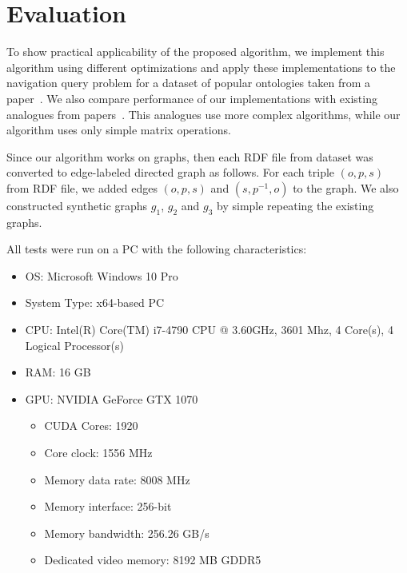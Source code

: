 \section{Evaluation}
To show practical applicability of the proposed algorithm, we implement this algorithm using different optimizations and apply these implementations to the navigation query problem for a dataset of popular ontologies taken from a paper~\cite{RDF}. We also compare performance of our implementations with existing analogues from papers~\cite{GLL,RDF}. This analogues use more complex algorithms, while our algorithm uses only simple matrix operations.

Since our algorithm works on graphs, then each RDF file from dataset was converted to edge-labeled directed graph as follows. For each triple $(o,p,s)$ from RDF file, we added edges $(o,p,s)$ and $(s,p^{-1},o)$ to the graph. We also constructed synthetic graphs $g_1$, $g_2$ and $g_3$ by simple repeating the existing graphs.

All tests were run on a PC with the following characteristics:
\begin{itemize}
    \item OS: Microsoft Windows 10 Pro
    \item System Type: x64-based PC
    \item CPU: Intel(R) Core(TM) i7-4790 CPU @ 3.60GHz, 3601 Mhz, 4 Core(s), 4 Logical Processor(s)
    \item RAM: 16 GB
    \item GPU: NVIDIA GeForce GTX 1070
    \begin{itemize}
        \item CUDA Cores:		1920 
        \item Core clock:		1556 MHz 
        \item Memory data rate:	8008 MHz
        \item Memory interface:	256-bit 
        \item Memory bandwidth:	256.26 GB/s
        \item Dedicated video memory:	8192 MB GDDR5
    \end{itemize}
\end{itemize}

